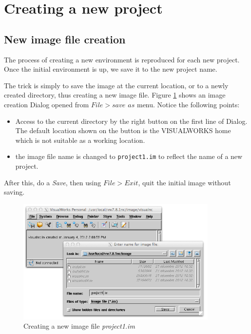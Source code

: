 \documentclass[times]{book}
\begin{document}
\section {Creating a new project }
\subsection {New image file creation }

The process of creating a new environment is reproduced for each new project. Once the initial 
environment is up, we save it to the new project name.

The trick is simply to save the image at the current location, or to a newly created directory,
thus creating a new image file. Figure 
\ref{fig:startInit-newEnv} shows an image creation Dialog opened from {\sl $File>save$ $as$} menu.
Notice the following points:
\begin{itemize}
\item Access to the current directory by the right button on the first line of Dialog.
The default location shown on the button is the VISUALWORKS home which is not suitable as a working location.

\item the image file name is changed to {\tt project1.im} to reflect the name of a new project.
\end{itemize}
After this, do a {\sl Save}, then using {\sl $File>Exit$}, quit the initial image without saving.
 
\begin{figure}[hbtp]
\begin{center} 
\includegraphics[width=10cm]{startInit-newEnv.png}
\caption{Creating a new image file {\sl project1.im} }
\label{fig:startInit-newEnv}
\end{center}
\end{figure}
\end{document}
